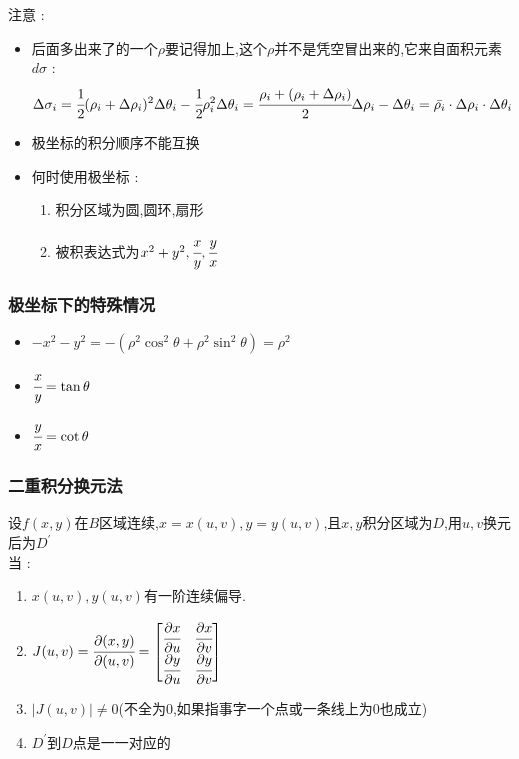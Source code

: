 \documentclass[UTF8,12pt]{ctexbook}
\newcommand{\derivative}{^\prime}
\newcommand{\defFunction}[1]{f(#1)}
\newcommand{\partialDerivativeFrac}[2]{\cfrac{\partial #1}{\partial #2}}
\newcommand{\absoluteValue}[1]{\left\lvert #1 \right\vert}
\begin{document}
{{{{    注意 :
    \begin{itemize}
      \item {
            后面多出来了的一个$\rho$要记得加上,这个$\rho$并不是凭空冒出来的,它来自面积元素$d\sigma$ :
            $$
              \Delta\sigma_i = \cfrac{1}{2}(\rho_i + \Delta\rho_i)^2\Delta\theta_i - \cfrac{1}{2}\rho_i^2\Delta\theta_i = \cfrac{\rho_i + (\rho_i + \Delta\rho_i)}{2}\Delta\rho_i - \Delta\theta_i = \bar{\rho_i}\cdot\Delta\rho_i\cdot\Delta\theta_i
            $$
            }
      \item {
            极坐标的积分顺序不能互换
            }
      \item{
            何时使用极坐标 :
            \begin{enumerate}
              \item 积分区域为圆,圆环,扇形
              \item 被积表达式为$x^2 + y^2,\cfrac{x}{y},\cfrac{y}{x}$
            \end{enumerate}
            }
    \end{itemize}

  }%

  \subsubsection{极坐标下的特殊情况}{
    \begin{itemize}
      \item $-x^2 -y^2 = -(\rho^2\cos^2\theta + \rho^2\sin^2\theta) = \rho^2$
      \item $\cfrac{x}{y} = \tan\theta$
      \item $\cfrac{y}{x} = \cot\theta$
    \end{itemize}
  }%

  \subsubsection{二重积分换元法}{
    设$\defFunction{x,y}$在$B$区域连续,$x = x(u,v),y = y(u,v)$,且$x,y$积分区域为$D$,用$u,v$换元后为$D\derivative$\\

    当 :
    \begin{enumerate}
      \item $x(u,v),y(u,v)$有一阶连续偏导.
      \item {
            $
              J(u,v)
              =
              \partialDerivativeFrac{(x,y)}{(u,v)} = \begin{bmatrix}
                \partialDerivativeFrac{x}{u} & \partialDerivativeFrac{x}{v} \\
                \partialDerivativeFrac{y}{u} & \partialDerivativeFrac{y}{v}
              \end{bmatrix}
            $
            }
      \item $\absoluteValue{J(u,v)} \neq 0$(不全为0,如果指事字一个点或一条线上为0也成立)
      \item $D\derivative$到$D$点是一一对应的
    \end{enumerate}

}}}}
\end{document}
